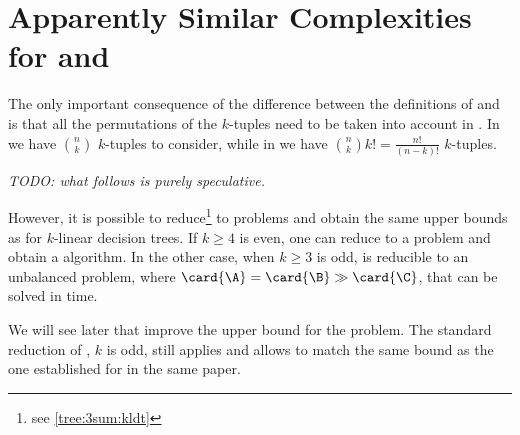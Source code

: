 \section{Apparently Similar Complexities for \kSUM and \kLDT}

The only important consequence of the difference between the definitions of
\kSUM and \kLDT is that all the permutations of the $k$-tuples need to be taken
into account in \kLDT. In \kSUM we have $\binom{n}{k}$ $k$-tuples to consider,
while in \kLDT we have $\binom{n}{k} k! = \frac{n!}{(n-k)!}$ $k$-tuples.

\emph{TODO: what follows is purely speculative.}

However, it is possible to reduce\footnote{see \ref{tree:3sum:kldt}} \kLDT to
\kSUM problems and obtain the same upper bounds as \kSUM for $k$-linear
decision trees. If $k \ge 4$ is even, one can reduce \kLDT to a \twoSUM problem
and obtain a  algorithm. In the other case, when
$k \ge 3$ is odd, \kLDT is reducible to an unbalanced \threeSUM problem, where
$\card{\A} = \card{\B} \gg \card{\C}$, that can be solved in
 time.

We will see later that \citet*{gronlund:2014} improve the upper bound for the
\threeSUM problem. The standard reduction of \kLDT, $k$ is odd, still applies
and allows to match the same 
bound as the one established for \threeSUM in the same paper.

